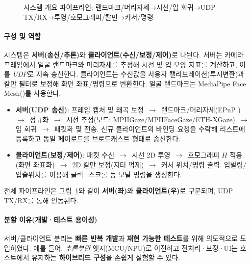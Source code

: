 \documentclass[10pt,a4paper]{article}
\begin{document}
\begin{figure}[H]
  \caption{시스템 개요 파이프라인: 랜드마크/머리자세→시선/입 회귀→UDP TX/RX→투영/호모그래피/칼만→커서/명령}
  \label{fig:pipeline}
\end{figure}

\paragraph{구성 및 역할} 시스템은 \textbf{서버(송신/추론)}와 \textbf{클라이언트(수신/보정/제어)}로 나뉜다. 서버는 카메라 프레임에서 얼굴 랜드마크와 머리자세를 추정해 시선 및 입 모양 지표를 계산하고, 이를 \emph{UDP}로 지속 송신한다. 클라이언트는 수신값을 사용자 캘리브레이션(투시변환)과 칼만 필터로 보정해 화면 좌표/명령으로 변환한다.
 얼굴 랜드마크는 MediaPipe Face Mesh(\cite{Kartynnik2019FaceMesh,Bazarevsky2019BlazeFace})를 사용한다.

\begin{itemize}
  \item \textbf{서버(UDP 송신)}: 프레임 캡처 및 왜곡 보정 \,$\to$\, 랜드마크/머리자세(EPnP \cite{Lepetit2009EPnP}) \,$\to$\, 정규화 \,$\to$\, 시선 추정(모드: MPIIGaze/\-MPIIFaceGaze/\-ETH-XGaze) \,$\to$\, 입 회귀 \,$\to$\, 패킷화 및 전송. 신규 클라이언트의 바인딩 요청을 수락해 리스트에 등록하고 동일 페이로드를 브로드캐스트 형태로 송신한다.
  \item \textbf{클라이언트(보정/제어)}: 패킷 수신 \,$\to$\, 시선 2D 투영 \,$\to$\, 호모그래피 $H$ 적용(화면 좌표화) \,$\to$\, 2D 칼만 보정(지터 억제) \,$\to$\, 커서 위치/명령 출력. 입벌림/입술위치를 이용해 클릭·스크롤 등 모달 명령을 생성한다.
\end{itemize}

전체 파이프라인은 그림~\ref{fig:pipeline}와 같이 \textbf{서버(좌)}와 \textbf{클라이언트(우)}로 구분되며, UDP TX/RX를 통해 연동된다.

\paragraph{분할 이유(개발·테스트 용이성)} 서버/클라이언트 분리는 \textbf{빠른 반복 개발}과 \textbf{재현 가능한 테스트}를 위해 의도적으로 도입하였다. 예를 들어, \emph{추론부만} 엣지(MCU/NPU)로 이전하고 전처리·보정·UI는 호스트에서 유지하는 \textbf{하이브리드 구성}을 손쉽게 실험할 수 있다.
\end{document}
